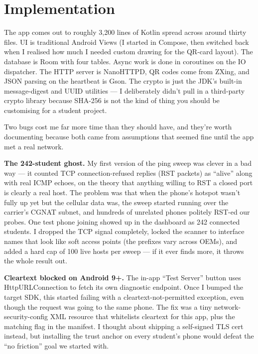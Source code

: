 \documentclass[sigconf,10pt]{acmart}
\begin{document}
\section{Implementation}

The app comes out to roughly 3,200 lines of Kotlin spread across
around thirty files. UI is traditional Android Views (I started in
Compose, then switched back when I realised how much I needed
custom drawing for the QR-card layout). The database is Room with
four tables. Async work is done in coroutines on the IO
dispatcher. The HTTP server is NanoHTTPD, QR codes come from
ZXing, and JSON parsing on the heartbeat is Gson. The crypto is
just the JDK's built-in message-digest and UUID utilities --- I
deliberately didn't pull in a third-party crypto library because
SHA-256 is not the kind of thing you should be customising for a
student project.

Two bugs cost me far more time than they should have, and they're
worth documenting because both came from assumptions that seemed
fine until the app met a real network.

\textbf{The 242-student ghost.} My first version of the ping
sweep was clever in a bad way --- it counted TCP
connection-refused replies (RST packets) as ``alive'' along with
real ICMP echoes, on the theory that anything willing to RST a
closed port is clearly a real host. The problem was that when the
phone's hotspot wasn't fully up yet but the cellular data was,
the sweep started running over the carrier's CGNAT subnet, and
hundreds of unrelated phones politely RST-ed our probes. One
test phone joining showed up in the dashboard as 242 connected
students. I dropped the TCP signal completely, locked the
scanner to interface names that look like soft access points
(the prefixes vary across OEMs), and added a hard cap of 100
live hosts per sweep --- if it ever finds more, it throws the
whole result out.

\textbf{Cleartext blocked on Android 9+.} The in-app
``Test Server'' button uses HttpURLConnection to fetch its own
diagnostic endpoint. Once I bumped the target SDK, this started
failing with a cleartext-not-permitted exception, even though
the request was going to the same phone. The fix was a tiny
network-security-config XML resource that whitelists cleartext
for this app, plus the matching flag in the manifest. I thought
about shipping a self-signed TLS cert instead, but installing
the trust anchor on every student's phone would defeat the
``no friction'' goal we started with.
\end{document}

